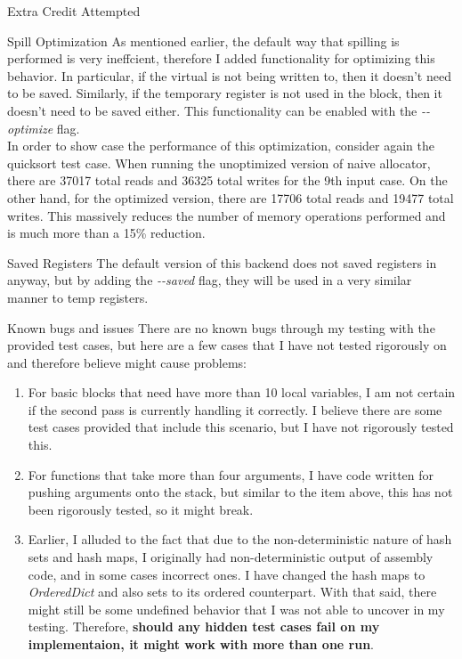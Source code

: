 \documentclass[letterpaper,12pt]{article}
\theoremstyle{definition}
\begin{document}
    \begin{section}{Extra Credit Attempted}
        \begin{subsection}{Spill Optimization}
            As mentioned earlier, the default way that spilling is performed is very ineffcient, therefore I added functionality for optimizing this behavior. In particular, if the virtual is not being written to, then it doesn't need to be saved. Similarly, if the temporary register is not used in the block, then it doesn't need to be saved either. This functionality can be enabled with the \textit{-{}-optimize} flag. \\
            In order to show case the performance of this optimization, consider again the quicksort test case. When running the unoptimized version of naive allocator, there are 37017 total reads and 36325 total writes for the 9th input case. On the other hand, for the optimized version, there are 17706 total reads and 19477 total writes. This massively reduces the number of memory operations performed and is much more than a 15\% reduction.
        \end{subsection}

        \begin{subsection}{Saved Registers}
            The default version of this backend does not saved registers in anyway, but by adding the \textit{-{}-saved} flag, they will be used in a very similar manner to temp registers.
        \end{subsection}
    \end{section}

    \begin{section}{Known bugs and issues}
        There are no known bugs through my testing with the provided test cases, but here are a few cases that I have not tested rigorously on and therefore believe might cause problems:
        \begin{enumerate}
            \item For basic blocks that need have more than 10 local variables, I am not certain if the second pass is currently handling it correctly. I believe there are some test cases provided that include this scenario, but I have not rigorously tested this.
            \item For functions that take more than four arguments, I have code written for pushing arguments onto the stack, but similar to the item above, this has not been rigorously tested, so it might break.
            \item Earlier, I alluded to the fact that due to the non-deterministic nature of hash sets and hash maps, I originally had non-deterministic output of assembly code, and in some cases incorrect ones. I have changed the hash maps to \textit{OrderedDict} and also sets to its ordered counterpart. With that said, there might still be some undefined behavior that I was not able to uncover in my testing. Therefore, \textbf{should any hidden test cases fail on my implementaion, it might work with more than one run}.
        \end{enumerate}
    \end{section}
\end{document}
